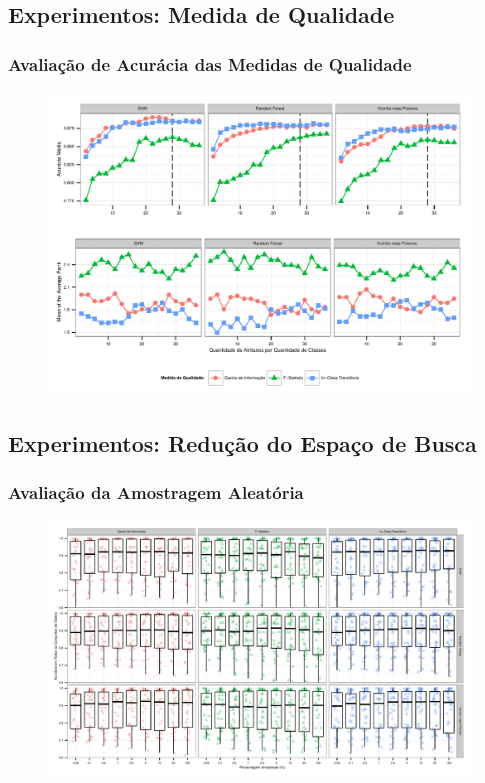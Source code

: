 \documentclass{beamer}
\begin{document}
\subsection{Experimentos: Medida de Qualidade}
\begin{frame}
\frametitle{Avalia{\c c}{\~a}o de Acur{\'a}cia das Medidas de Qualidade}

\begin{figure}
\includegraphics[width=0.85\linewidth]{images/accuracy-quality.pdf}
\end{figure}
\end{frame}

\subsection{Experimentos: Redu{\c c}{\~a}o do Espa{\c c}o de Busca}
\begin{frame}
\frametitle{Avalia{\c c}{\~a}o da Amostragem Aleat{\'o}ria}

\begin{figure}
\includegraphics[width=1.0\linewidth]{images/random-sampling.pdf}
\end{figure}
\end{frame}
\end{document}
